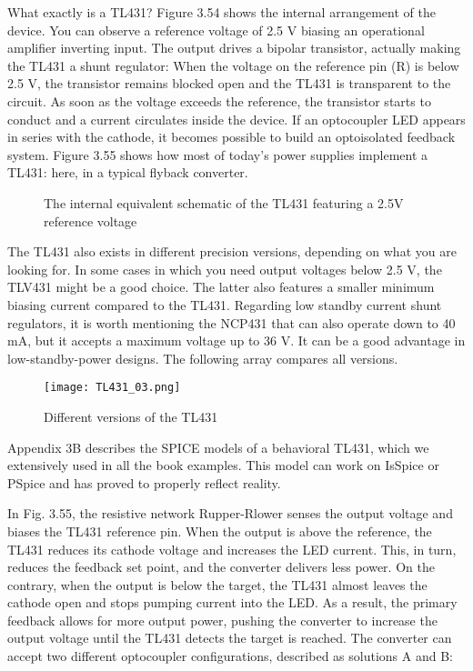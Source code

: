       What exactly is a TL431? Figure 3.54 shows the internal arrangement of the device. You can 
      observe a reference voltage of 2.5 V biasing an operational amplifier inverting input. The 
      output drives a bipolar transistor, actually making the TL431 a shunt regulator: When the 
      voltage on the reference pin (R) is below 2.5 V, the transistor remains blocked open and the 
      TL431 is transparent to the circuit. As soon as the voltage exceeds the reference, the 
      transistor starts to conduct and a current circulates inside the device. If an optocoupler 
      LED appears in series with the cathode, it becomes possible to build an optoisolated feedback 
      system. Figure 3.55 shows how most of today’s power supplies implement a TL431: here, in a 
      typical flyback converter.
      \begin{figure}[ht!]
        \centering  
        \caption{The internal equivalent schematic of the TL431 featuring a 2.5V reference voltage  
          \cite[s.~43]{Basso2008}} 
        \label{enz:fig_tl431_01}
      \end{figure}
      
      The TL431 also exists in different precision versions, depending on what you are looking for. 
      In some cases in which you need output voltages below 2.5 V, the TLV431 might be a good 
      choice. The latter also features a smaller minimum biasing current compared to the TL431. 
      Regarding low standby current shunt regulators, it is worth mentioning the NCP431 that can 
      also operate down to 40 mA, but it accepts a maximum voltage up to 36 V. It can be a good 
      advantage in low-standby-power designs. The following array compares all versions.
  
      \begin{figure}[ht!]
        \centering
        \texttt{[image: TL431\_03.png]}
        \caption{Different versions of the TL431\cite[s.~43]{Basso2008}}
        \label{enz:fig_tl431_03}
      \end{figure}
      Appendix 3B describes the SPICE models of a behavioral TL431, which we extensively used in 
      all the book examples. This model can work on IsSpice or PSpice and has proved to properly 
      reflect reality.
      
      In Fig. 3.55, the resistive network Rupper-Rlower senses the output voltage and biases the 
      TL431 reference pin. When the output is above the reference, the TL431 reduces its cathode 
      voltage and increases the LED current. This, in turn, reduces the feedback set point, and the 
      converter delivers less power. On the contrary, when the output is below the target, the 
      TL431 almost leaves the cathode open and stops pumping current into the LED. As a result, the 
      primary feedback allows for more output power, pushing the converter to increase the output 
      voltage until the TL431 detects the target is reached. The converter can accept two different 
      optocoupler configurations, described as solutions A and B:
      
